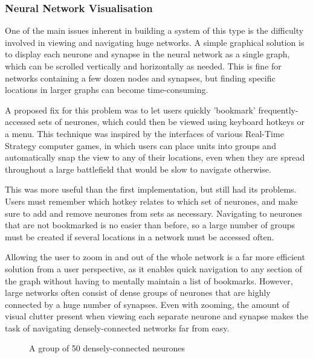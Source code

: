 \documentclass{acm_proc_article-sp}
\begin{document}
\subsubsection{Neural Network Visualisation}
{
One of the main issues inherent in building a system of this type is the difficulty involved in viewing and navigating huge networks. A simple graphical solution is to display each neurone and synapse in the neural network as a single graph, which can be scrolled vertically and horizontally as needed. This is fine for networks containing a few dozen nodes and synapses, but finding specific locations in larger graphs can become time-consuming.

A proposed fix for this problem was to let users quickly 'bookmark' frequently-accessed sets of neurones, which could then be viewed using keyboard hotkeys or a menu. This technique was inspired by the interfaces of various Real-Time Strategy computer games, in which users can place units into groups and automatically snap the view to any of their locations, even when they are spread throughout a large battlefield that would be slow to navigate otherwise.

This was more useful than the first implementation, but still had its problems. Users must remember which hotkey relates to which set of neurones, and make sure to add and remove neurones from sets as necessary. Navigating to neurones that are not bookmarked is no easier than before, so a large number of groups must be created if several locations in a network must be accessed often.

Allowing the user to zoom in and out of the whole network is a far more efficient solution from a user perspective, as it enables quick navigation to any section of the graph without having to mentally maintain a list of bookmarks. However, large networks often consist of dense groups of neurones that are highly connected by a huge number of synapses. Even with zooming, the amount of visual clutter present when viewing each separate neurone and synapse makes the task of navigating densely-connected networks far from easy.

\begin{figure}[t]
\centering
{}
\caption{A group of 50 densely-connected neurones}
\label{fig:ui:lotsofneurones}
\end{figure}

}
\end{document}
